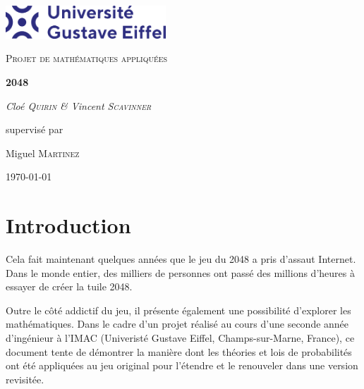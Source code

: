 \documentclass[a4paper, 12pt]{report}
\begin{document}
\begin{titlepage}

\centering

\includegraphics[width=0.45\textwidth]{images/gustave-eiffel-university.png}\par\vspace{1cm}

{\scshape\Large Projet de mathématiques appliquées\par}

\vspace{1.5cm}

{\huge\bfseries 2048\par}

\vspace{2cm}

{\Large\itshape Cloé \textsc{Quirin} \& Vincent \textsc{Scavinner}\par}

\vfill
supervisé par\par
Miguel \textsc{Martinez}
\vfill

{\large \today\par}

\end{titlepage}

\begin{abstract}
Rapport de projet documentant la réflexion et les choix d'implémentation réalisés dans le cadre de la conception d'une version revisitée du jeu 2048, utilisant des lois de probabilités mathématiques. 
Le code source du projet est disponible à l'adresse suivante : \href{https://github.com/vscav/2048}{https://github.com/vscav/2048}.
\end{abstract}

\tableofcontents

\chapter{Introduction}

\tabto{1cm}Cela fait maintenant quelques années que le jeu du 2048 a pris d'assaut Internet.
Dans le monde entier, des milliers de personnes ont passé des millions d'heures à
essayer de créer la tuile 2048.

\vspace{0.5cm}

\tabto{1cm}Outre le côté addictif du jeu, il présente également une possibilité
d'explorer les mathématiques. Dans le cadre d'un projet réalisé au cours d'une seconde année d'ingénieur
à l'IMAC (Univeristé Gustave Eiffel, Champs-sur-Marne, France), ce document tente de
démontrer la manière dont les théories et lois de probabilités ont été appliquées au jeu
original pour l'étendre et le renouveler dans une version revisitée.
\end{document}
